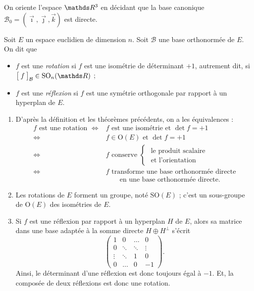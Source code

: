 \begin{exm}
	On oriente l'espace $\R^3$\/ en décidant que la base canonique $\mathcal{B}_0 = (\vec{\imath}, \vec{\jmath}, \vec{k})$\/ est directe.
\end{exm}

\begin{defn}
	Soit $E$\/ un espace euclidien de dimension $n$. Soit $\mathcal{B}$\/ une base orthonormée de $E$. On dit que
	\begin{itemize}
		\item $f$\/ est une \textit{rotation} si $f$\/ est une isométrie de déterminant $+1$, autrement dit, si~$\big[\:f\:\big]_\mathcal{B} \in \mathrm{SO}_n(\R)$\/ ;
		\item $f$\/ est une \textit{réflexion} si $f$\/ est une symétrie orthogonale par rapport à un hyperplan de $E$.
	\end{itemize}
\end{defn}

\begin{rmk}
	\begin{enumerate}
		\item D'après la définition et les théorèmes précédents, on a les équivalences :
			\begin{align*}
				f \text{ est une rotation } \iff& f \text{ est une isométrie et } \det f = +1 \\
				\iff& f \in \mathrm{O}(E) \text{ et } \det f = +1 \\
				\iff& f \text{ conserve } \begin{cases}
					\text{ le produit scalaire}\\
					\text{ et l'orientation}
				\end{cases} \\
					\iff& f \text{ transforme une base orthonormée directe} \\[-2mm]
						&\quad\quad\text{en une base orthonormée directe}.
			\end{align*}
		\item Les rotations de $E$\/ forment un groupe, noté $\mathrm{SO}(E)$\/ ; c'est un sous-groupe de $\mathrm{O}(E)$\/ des isométries de $E$.
		\item Si $f$\/ est une réflexion par rapport à un hyperplan $H$\/ de $E$, alors sa matrice dans une base adaptée à la somme directe $H \oplus H^\perp$\/ s'écrit \[
			\begin{pmatrix}
				1 & 0 & \ldots & 0\\
				0 & \ddots & \ddots & \vdots\\
				\vdots & \ddots & 1 & 0\\
				0 & \ldots & 0 & -1
			\end{pmatrix} 
		.\] Ainsi, le déterminant d'une réflexion est donc toujours égal à $-1$. Et, la composée de deux réflexions est donc une rotation.
	\end{enumerate}
\end{rmk}

